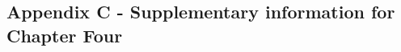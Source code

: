 \documentclass[
]{article}
\begin{document}
\renewcommand{\thefigure}{A3.\arabic{figure}}
\setcounter{figure}{0}
\renewcommand{\thetable}{A3.\arabic{table}}
\setcounter{table}{0}
\renewcommand{\theequation}{A3.\arabic{equation}}
\setcounter{equation}{0}

\subsection{Appendix C - Supplementary information for Chapter Four}\label{appendix-c---supplementary-information-for-chapter-four}

\renewcommand{\thefigure}{A4.\arabic{figure}}
\setcounter{figure}{0}
\renewcommand{\thetable}{A4.\arabic{table}}
\setcounter{table}{0}
\renewcommand{\theequation}{A4.\arabic{equation}}
\setcounter{equation}{0}
\end{document}

